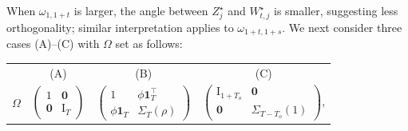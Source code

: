 \documentclass[12pt]{article}
\begin{document}
When $\omega_{1,1+t}$ is larger, the angle between $Z_j^{\star}$ and $W_{t,j}^{\star}$ is smaller, suggesting less orthogonality; similar interpretation applies to $\omega_{1+t,1+s}$. 
We next consider three cases (A)--(C) with $\Omega$ set as follows: 
\begin{table}[!htbp]
\renewcommand{\arraystretch}{1}
\setlength{\tabcolsep}{12pt} 
    \centering
    \begin{tabular}{c|c c   c}
    &   (A)  &  (B) & (C) \\
$\Omega$ & $ \begin{pmatrix}
        1 & \mathbf{0}\\
        \mathbf{0} & \mathrm{I}_T
    \end{pmatrix}$ 
& $\begin{pmatrix}
       1 & \phi \mathbf{1}_{T}^{\top}\\
       \phi \mathbf{1}_{T} &  \Sigma_{T}(\rho)
    \end{pmatrix}$
    & $\begin{pmatrix}
        \mathrm{I}_{1+T_o} & \mathbf{0}\\
        \mathbf{0} & \Sigma_{T - T_o }(1)
    \end{pmatrix}$, 
    \end{tabular}
\end{table}
\end{document}
